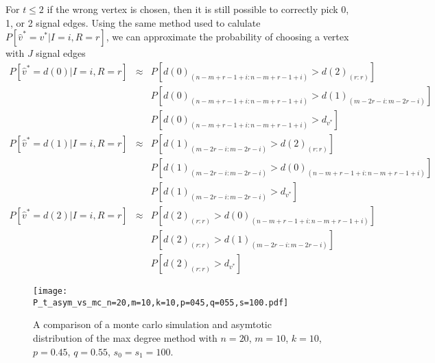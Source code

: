 \documentclass{article}
\begin{document}
For $t\leq 2$ if the wrong vertex is chosen, then it is still possible to correctly pick 0, 1, or 2 signal edges.
Using the same method used to calulate $P[\hat{v}^* = v^*|I=i,R=r]$, we can approximate the probability of choosing a vertex with $J$ signal edges
\begin{eqnarray*}
P[\hat{v}^* = d(0)| I=i, R=r]
&\approx&
P[d(0)_{(n-m+r-1+i:n-m+r-1+i)} >  d(2)_{(r:r)}]
\\&&
P[ d(0)_{(n-m+r-1+i:n-m+r-1+i)} > d(1)_{(m-2r-i:m-2r-i)}]
\\&&
P[ d(0)_{(n-m+r-1+i:n-m+r-1+i)} > d_{v^*}]
\\
P[\hat{v}^* = d(1)| I=i, R=r]
&\approx&
P[d(1)_{(m-2r-i:m-2r-i)} >  d(2)_{(r:r)}] 
\\&&
P[ d(1)_{(m-2r-i:m-2r-i)} > d(0)_{(n-m+r-1+i:n-m+r-1+i)}]
\\&&
P[ d(1)_{(m-2r-i:m-2r-i)} > d_{v^*}]
\\
P[\hat{v}^* = d(2)| I=i, R=r]
&\approx&
P[d(2)_{(r:r)} > d(0)_{(n-m+r-1+i:n-m+r-1+i)}]
\\&&
P[ d(2)_{(r:r)} > d(1)_{(m-2r-i:m-2r-i)}]
\\&&
P[ d(2)_{(r:r)} > d_{v^*}]
\end{eqnarray*}

\begin{figure}[!b]
\centering
\texttt{[image: P\_t\_asym\_vs\_mc\_n=20,m=10,k=10,p=045,q=055,s=100.pdf]}
\caption{A comparison of a monte carlo simulation and asymtotic distribution of the max degree method with $n=20$, $m=10$, $k=10$, $p=0.45$, $q=0.55$, $s_0=s_1=100$.}
\label{fig:maxdeg_asym}
\end{figure}
\end{document}
